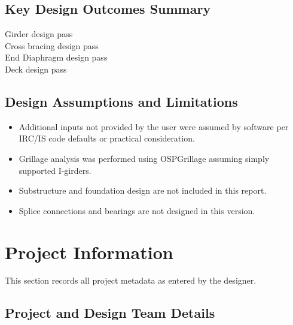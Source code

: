 \documentclass[12pt,a4paper]{report}
\numberwithin{table}{chapter}
\numberwithin{figure}{chapter}
\newcommand{\ReportTitleLarge}{\Large}
\begin{document}
\section*{Key Design Outcomes Summary}
\label{sec:key-outcomes}

\noindent Girder design pass \\
Cross bracing design pass \\
End Diaphragm design pass \\
Deck design pass

\section*{Design Assumptions and Limitations}
\label{sec:assumptions}

\begin{itemize}
\item Additional inputs not provided by the user were assumed by software per IRC/IS code defaults or practical consideration.
\item Grillage analysis was performed using OSPGrillage assuming simply supported I-girders.
\item Substructure and foundation design are not included in this report.
\item Splice connections and bearings are not designed in this version.
\end{itemize}

\titleformat{\chapter}[block]{\normalfont\ReportTitleLarge\bfseries\centering}{\thechapter}{1em}{}
\titlespacing*{\chapter}{0pt}{-30pt}{10pt}


\chapter{Project Information}

This section records all project metadata as entered by the designer.

\section{Project and Design Team Details}
\label{sec:project-details}
\end{document}
